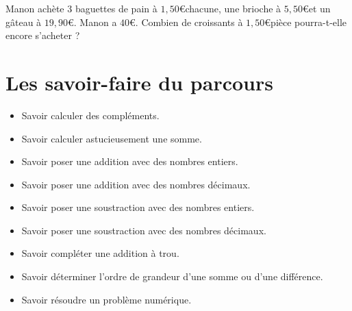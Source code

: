 \documentclass[a4paper,dvipsnames]{article}
\begin{document}
\begin{ExOApp}[]
Manon achète $3$ baguettes de pain à $1,50$\euro chacune, une brioche à $5,50$\euro et un gâteau à $19,90$\euro. Manon a $40$\euro. Combien de croissants à $1,50$\euro pièce pourra-t-elle encore s'acheter ?
\end{ExOApp}

\section{Les savoir-faire du parcours}

\begin{CpsCol}
\begin{itemize}
\item Savoir calculer des compléments.
\item Savoir calculer astucieusement une somme.
\item Savoir poser une addition avec des nombres entiers.
\item Savoir poser une addition avec des nombres décimaux.
\item Savoir poser une soustraction avec des nombres entiers.
\item Savoir poser une soustraction avec des nombres décimaux.
\item Savoir compléter une addition à trou.
\item Savoir déterminer l'ordre de grandeur d'une somme ou d'une différence.
\item Savoir résoudre un problème numérique.
\end{itemize}
\end{CpsCol}
\end{document}
